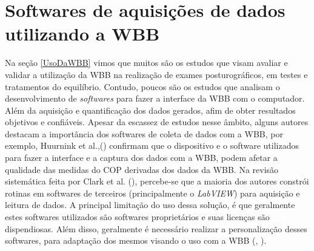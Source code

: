 \section{Softwares de aquisições de dados utilizando  a WBB}

Na seção \ref{UsoDaWBB} vimos que muitos são os estudos que visam avaliar e validar a utilização da WBB na realização de exames posturográficos, em testes e tratamentos do equilíbrio. Contudo, poucos são os estudos que analisam o desenvolvimento de \textit{softwares} para fazer a interface da WBB com o computador. Além da aquisição e quantificação dos dados gerados, afim de obter resultados objetivos e confiáveis. Apesar da escassez de estudos nesse âmbito, alguns autores destacam a importância dos softwares de coleta de dados com a WBB, por exemplo, Huurnink et al.,(\citeyear{huurnink2013comparison}) confirmam que o dispositivo e o software utilizados para fazer a interface e a captura dos dados com a WBB, podem afetar a qualidade das medidas do COP derivadas dos dados da WBB. Na revisão sistemática feita por Clark et al. (\citeyear{clark2018reliability}), percebe-se que a maioria dos autores constrói rotinas em softwares de terceiros (principalmente o \textit{LabVIEW}) para aquisição e leitura de dados. A principal limitação do uso dessa solução, é que geralmente estes softwares utilizados são softwares proprietários e suas licenças são dispendiosas. Além disso, geralmente é necessário realizar a personalização desses softwares, para adaptação dos mesmos visando o uso com a WBB (\citeauthor{clark2010validity}, \citeyear{clark2010validity}).




